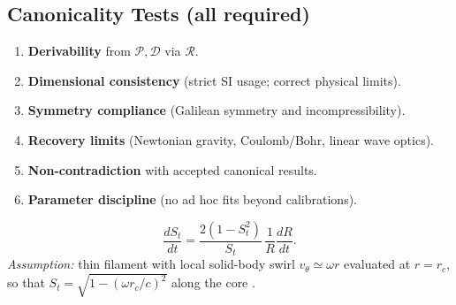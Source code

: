 \documentclass[10pt,reprint,aps,onecolumn,nofootinbib]{revtex4-2}
\begin{document}
    \subsection*{Canonicality Tests (all required)}
    \begin{enumerate}
    \item \textbf{Derivability} from $\mathcal{P},\mathcal{D}$ via $\mathcal{R}$.
    \item \textbf{Dimensional consistency} (strict SI usage; correct physical limits).
    \item \textbf{Symmetry compliance} (Galilean symmetry and incompressibility).
    \item \textbf{Recovery limits} (Newtonian gravity, Coulomb/Bohr, linear wave optics).
    \item \textbf{Non-contradiction} with accepted canonical results.
    \item \textbf{Parameter discipline} (no ad hoc fits beyond calibrations).
    \end{enumerate}
    \begin{tcolorbox}[title=Corollary: Clock--Radius Transport]
    \[
        \frac{dS_t}{dt}=\frac{2(1-S_t^2)}{S_t}\,\frac{1}{R}\frac{dR}{dt}.
    \]
    \textit{Assumption:} thin filament with local solid-body swirl $v_\theta\simeq \omega r$ evaluated at $r=r_c$, so that
    $S_t=\sqrt{1-(\omega r_c/c)^2}$ along the core \cite{Batchelor1967,Saffman1992}. %
    \end{tcolorbox}

\end{document}
